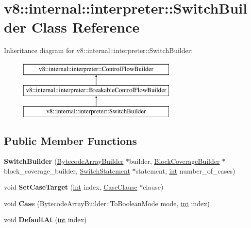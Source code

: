 \hypertarget{classv8_1_1internal_1_1interpreter_1_1SwitchBuilder}{}\section{v8\+:\+:internal\+:\+:interpreter\+:\+:Switch\+Builder Class Reference}
\label{classv8_1_1internal_1_1interpreter_1_1SwitchBuilder}
Inheritance diagram for v8\+:\+:internal\+:\+:interpreter\+:\+:Switch\+Builder\+:\begin{figure}[H]
\begin{center}
\leavevmode
\includegraphics[height=3.000000cm]{classv8_1_1internal_1_1interpreter_1_1SwitchBuilder}
\end{center}
\end{figure}
\subsection*{Public Member Functions}
\begin{DoxyCompactItemize}
\item 
\mbox{\label{classv8_1_1internal_1_1interpreter_1_1SwitchBuilder_af9b61541cabddaab5094fffd9ddabd03}} 
{\bfseries Switch\+Builder} (\mbox{\hyperlink{classv8_1_1internal_1_1interpreter_1_1BytecodeArrayBuilder}{Bytecode\+Array\+Builder}} $\ast$builder, \mbox{\hyperlink{classv8_1_1internal_1_1interpreter_1_1BlockCoverageBuilder}{Block\+Coverage\+Builder}} $\ast$block\+\_\+coverage\+\_\+builder, \mbox{\hyperlink{classv8_1_1internal_1_1SwitchStatement}{Switch\+Statement}} $\ast$statement, \mbox{\hyperlink{classint}{int}} number\+\_\+of\+\_\+cases)
\item 
\mbox{\label{classv8_1_1internal_1_1interpreter_1_1SwitchBuilder_a6738589c296745b6bbbdb15300662533}} 
void {\bfseries Set\+Case\+Target} (\mbox{\hyperlink{classint}{int}} index, \mbox{\hyperlink{classv8_1_1internal_1_1CaseClause}{Case\+Clause}} $\ast$clause)
\item 
\mbox{\label{classv8_1_1internal_1_1interpreter_1_1SwitchBuilder_a4f87ca61984c5331d8e10852a4b83fba}} 
void {\bfseries Case} (Bytecode\+Array\+Builder\+::\+To\+Boolean\+Mode mode, \mbox{\hyperlink{classint}{int}} index)
\item 
\mbox{\label{classv8_1_1internal_1_1interpreter_1_1SwitchBuilder_ad49a16c4a802550d9c8831a4411a15b8}} 
void {\bfseries Default\+At} (\mbox{\hyperlink{classint}{int}} index)
\end{DoxyCompactItemize}
